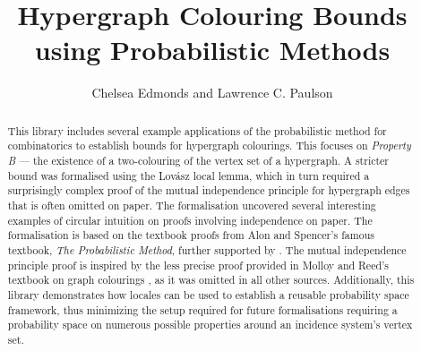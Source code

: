 \documentclass[11pt,a4paper]{article}
\begin{document}
\title{Hypergraph Colouring Bounds using Probabilistic Methods}
\author{Chelsea Edmonds and Lawrence C. Paulson}
\maketitle

\begin{abstract}
  This library includes several example applications of the probabilistic method for combinatorics to establish bounds for hypergraph colourings. This focuses on \textit{Property B} --- the existence of a two-colouring of the vertex set of a hypergraph. A stricter bound was formalised using the Lov\'asz local lemma, which in turn required a surprisingly complex proof of the mutual independence principle for hypergraph edges that is often omitted on paper. The formalisation uncovered several interesting examples of circular intuition on proofs involving independence on paper. The formalisation is based on the textbook proofs from Alon and Spencer's famous textbook, \textit{The Probabilistic Method}\cite{alonProbabilisticMethod2008}, further supported by \cite{Zhaonotes}. The mutual independence principle proof is inspired by the less precise proof provided in Molloy and Reed's textbook on graph colourings \cite{molloy2002graph}, as it was omitted in all other sources. Additionally, this library demonstrates how locales can be used to establish a reusable probability space framework, thus minimizing the setup required for future formalisations requiring a probability space on numerous possible properties around an incidence system's vertex set.
\end{abstract}

\tableofcontents





\end{document}
